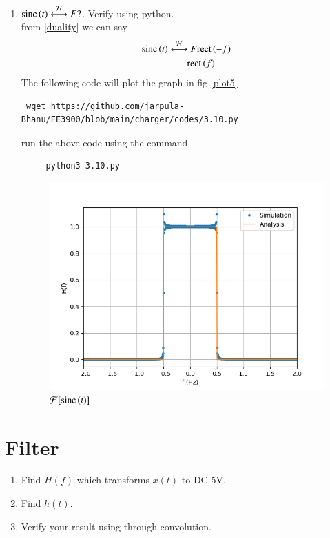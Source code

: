 \documentclass[journal,12pt,twocolumn]{IEEEtran}
\renewcommand\thesection{\arabic{section}}
\begin{document}
\begin{enumerate}[label=\thesection.\arabic*
	,ref=\thesection.\theenumi]
\begin{figure}[!ht]
		\caption{$\mathcal{F}[\rect{t}]$}
		\label{plot4}
	\end{figure}
	 \item $\text{sinc}\left(t\right)\overset{\mathcal{H}}{ \longleftrightarrow}{F} ?$.  Verify using python.\\
	 \solution from \eqref{duality} we can say
	 \begin{align}
		\text{sinc}\left(t\right) &\overset{\mathcal{H}}{ \longleftrightarrow}{F} \text{rect}\left(-f\right)\\
		& \qquad \text{rect}\left(f\right)
	 \end{align}
	 The following code will plot the graph in fig \eqref{plot5}
	 \begin{lstlisting}
 wget https://github.com/jarpula-Bhanu/EE3900/blob/main/charger/codes/3.10.py
	 \end{lstlisting}
	 run the above code using the command
	 \begin{lstlisting}
	 python3 3.10.py
	 \end{lstlisting}
	 \begin{figure}[!ht]
		 \includegraphics[width=\columnwidth]{./figs/3.10.png}
		 \caption{$\mathcal{F}[\text{sinc}\left(t\right)]$}
		 \label{plot5}
	 \end{figure}
	\end{enumerate}

	\section{Filter}

\begin{enumerate}[label=\thesection.\arabic*
	,ref=\thesection.\theenumi]
	\item Find $H(f)$ which transforms $x(t)$ to DC 5V.
	\item Find $h(t)$.
	\item Verify your result using  through convolution.
	\end{enumerate}
\end{document}

